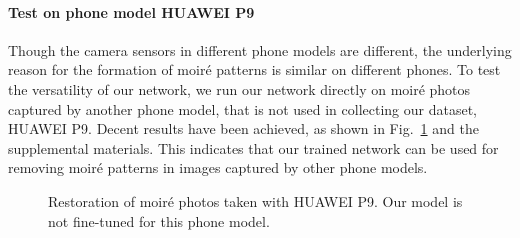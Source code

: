 \documentclass[journal]{IEEEtran}
\begin{document}
\begin{table}[htb!]
\centering
\caption{Cross-data evaluation.}
\label{table:crossV}
\end{table}

\paragraph{Test on phone model HUAWEI P9} Though the camera sensors in different phone models are different, the underlying reason for the formation of moir\'{e} patterns is similar on different phones. To test the versatility of our network, we run our network directly on moir\'{e} photos captured by another phone model, that is not used in collecting our dataset, HUAWEI P9. Decent results have been achieved, as shown in Fig.~\ref{fig:otherphone} and the supplemental materials. This indicates that our trained network can be used for removing moir\'{e} patterns in images captured by other phone models.

\begin{figure}[htb!]
\begin{center}
\hspace{-.8em}
\hspace{-.8em}
\hspace{-.8em}
\end{center}
\caption{Restoration of moir\'{e} photos taken with HUAWEI P9. Our model is not fine-tuned for this phone model.}
\label{fig:otherphone}
\end{figure}
\end{document}
